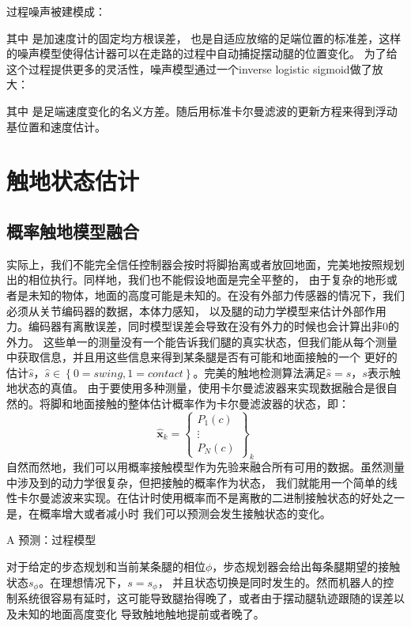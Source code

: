 过程噪声被建模成：

其中 是加速度计的固定均方根误差， 也是自适应放缩的足端位置的标准差，这样的噪声模型使得估计器可以在走路的过程中自动捕捉摆动腿的位置变化。
为了给这个过程提供更多的灵活性，噪声模型通过一个inverse logistic sigmoid做了放大：

其中 是足端速度变化的名义方差。随后用标准卡尔曼滤波的更新方程来得到浮动基位置和速度估计。

\section{触地状态估计}
\subsection{概率触地模型融合}
实际上，我们不能完全信任控制器会按时将脚抬离或者放回地面，完美地按照规划出的相位执行。同样地，我们也不能假设地面是完全平整的，
由于复杂的地形或者是未知的物体，地面的高度可能是未知的。在没有外部力传感器的情况下，我们必须从关节编码器的数据，本体力感知，
以及腿的动力学模型来估计外部作用力。编码器有离散误差，同时模型误差会导致在没有外力的时候也会计算出非0的外力。
这些单一的测量没有一个能告诉我们腿的真实状态，但我们能从每个测量中获取信息，并且用这些信息来得到某条腿是否有可能和地面接触的一个
更好的估计$\hat s$，$\hat s \in \left\{0=swing, 1=contact\right\}$。完美的触地检测算法满足$\hat s = s$，$s$表示触地状态的真值。
由于要使用多种测量，使用卡尔曼滤波器来实现数据融合是很自然的。将脚和地面接触的整体估计概率作为卡尔曼滤波器的状态，即：
\begin{equation}
    \label{equ:est_state}
    \hat{\boldsymbol{x}}_k=\left\{\begin{array}{c}
        P_1(c) \\
        \vdots \\
        P_N(c)
        \end{array}\right\}_k
\end{equation}
自然而然地，我们可以用概率接触模型作为先验来融合所有可用的数据。虽然测量中涉及到的动力学很复杂，但把接触的概率作为状态，
我们就能用一个简单的线性卡尔曼滤波来实现。在估计时使用概率而不是离散的二进制接触状态的好处之一是，在概率增大或者减小时
我们可以预测会发生接触状态的变化。

A 预测：过程模型

对于给定的步态规划和当前某条腿的相位$\phi$，步态规划器会给出每条腿期望的接触状态$s_{\phi}$。在理想情况下，$s = s_{\phi}$，
并且状态切换是同时发生的。然而机器人的控制系统很容易有延时，这可能导致腿抬得晚了，或者由于摆动腿轨迹跟随的误差以及未知的地面高度变化
导致触地触地提前或者晚了。

